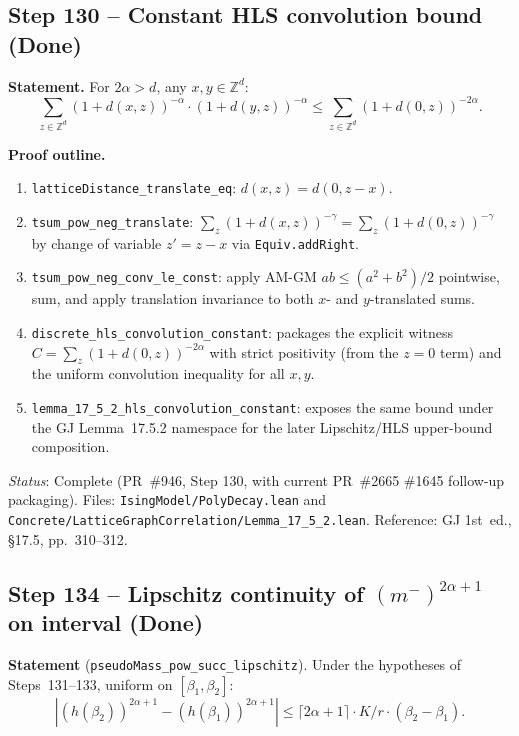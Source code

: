\documentclass[a4paper,11pt]{article}
\begin{document}
\subsection*{Step 130 -- Constant HLS convolution bound (Done)}

\noindent\textbf{Statement.}
For $2\alpha > d$, any $x, y \in \mathbb{Z}^d$:
\[
\sum_{z \in \mathbb{Z}^d} (1 + d(x,z))^{-\alpha} \cdot (1 + d(y,z))^{-\alpha}
\leq \sum_{z \in \mathbb{Z}^d} (1 + d(0,z))^{-2\alpha}.
\]

\noindent\textbf{Proof outline.}
\begin{enumerate}
\item \texttt{latticeDistance\_translate\_eq}: $d(x,z) = d(0,z-x)$.
\item \texttt{tsum\_pow\_neg\_translate}: $\sum_z (1+d(x,z))^{-\gamma} = \sum_z (1+d(0,z))^{-\gamma}$
  by change of variable $z' = z - x$ via \texttt{Equiv.addRight}.
\item \texttt{tsum\_pow\_neg\_conv\_le\_const}: apply AM-GM $ab \leq (a^2+b^2)/2$
  pointwise, sum, and apply translation invariance to both $x$- and $y$-translated sums.
\item \texttt{discrete\_hls\_convolution\_constant}: packages the explicit
  witness $C=\sum_z(1+d(0,z))^{-2\alpha}$ with strict positivity (from the
  $z=0$ term) and the uniform convolution inequality for all $x,y$.
\item \texttt{lemma\_17\_5\_2\_hls\_convolution\_constant}: exposes the same
  bound under the GJ Lemma~17.5.2 namespace for the later
  Lipschitz/HLS upper-bound composition.
\end{enumerate}

\noindent\textit{Status}: Complete (PR~\#946, Step 130, with current
PR~\#2665 \#1645 follow-up packaging).
Files: \texttt{IsingModel/PolyDecay.lean} and
\texttt{Concrete/LatticeGraphCorrelation/Lemma\_17\_5\_2.lean}.
Reference: GJ 1st~ed., \S17.5, pp.~310--312.

\subsection*{Step 134 -- Lipschitz continuity of $(m^-)^{2\alpha+1}$ on interval (Done)}

\noindent\textbf{Statement} (\texttt{pseudoMass\_pow\_succ\_lipschitz}).
Under the hypotheses of Steps~131--133, uniform on $[\beta_1,\beta_2]$:
\[|(h(\beta_2))^{2\alpha+1} - (h(\beta_1))^{2\alpha+1}|
  \leq \lceil 2\alpha+1\rceil\cdot K/r \cdot (\beta_2-\beta_1).\]
\end{document}
